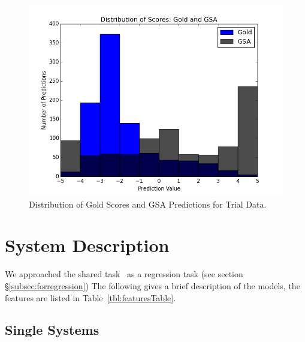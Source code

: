 \documentclass[11pt,letterpaper]{article}
\begin{document}
\begin{figure}[ht!]
    \centering
    \includegraphics[width=\columnwidth]{gold_gsa_distributions3.png}%
    \caption{Distribution of Gold Scores and GSA Predictions for Trial Data.}
    \label{fig:TrialGoldGSADist}
\end{figure}



\section{System Description}
We approached the shared task~\cite{semevalTask11} as a regression task (see section \S \ref{subsec:forregression}) %
The following gives a brief description of the models, the features are listed in Table~\ref{tbl:featuresTable}.

\subsection{Single Systems}
\label{subsec:SingleSystems}

\end{document}
